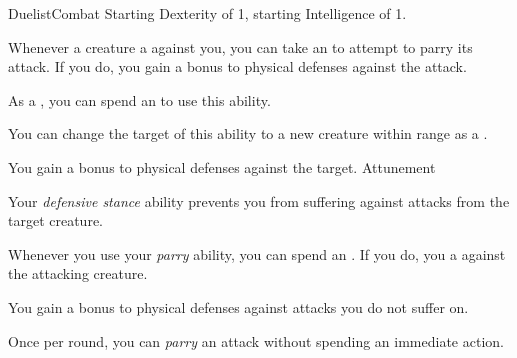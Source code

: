     \begin{feat}{Duelist}{Combat}
        \featpre Starting Dexterity of 1, starting Intelligence of 1.
        \featben

         Whenever a creature  a  against you, you can take an  to attempt to parry its attack.
        If you do, you gain a  bonus to physical defenses against the attack.

         As a , you can spend an  to use this ability.
        \begin{ability}
            \begin{spelltargetinginfo}
                \spellspecial You can change the target of this ability to a new creature within range as a .
            \end{spelltargetinginfo}
            \begin{spelleffects}
                \spelleffect You gain a  bonus to physical defenses against the target.
                \spelldur Attunement
            \end{spelleffects}
        \end{ability}

        \ff[4]{} 

         Your \textit{defensive stance} ability prevents you from suffering  against attacks from the target creature.

         Whenever you use your \textit{parry} ability, you can spend an .
        If you do, you  a  against the attacking creature.

         You gain a  bonus to physical defenses against attacks you do not suffer  on.

         Once per round, you can \textit{parry} an attack without spending an immediate action.
    \end{feat}


